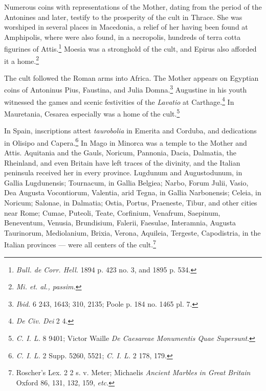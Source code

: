 \documentclass[a4paper, 11pt, oneside, polutonikogreek, french]{article}
\begin{document}
Numerous coins with representations of the Mother, dating from the period of the Antonines and later, testify to the prosperity of the cult in Thrace. She was worshiped in several places in Macedonia, a relief of her having been found at Amphipolis, where were also found, in a necropolis, hundreds of terra cotta figurines of Attis.\footnote{\emph{Bull. de Corr. Hell.} 1894 p. 423 no. 3, and 1895 p. 534.} Moesia was a stronghold of the cult, and Epirus also afforded it a home.\footnote{\emph{Mi. et. al., passim.}}

The cult followed the Roman arms into Africa. The Mother appears on Egyptian coins of Antoninus Pius, Faustina, and Julia Domna.\footnote{\emph{Ibid.} 6 243, 1643; 310, 2135; Poole p. 184 no. 1465 pl. 7.} Augustine in his youth witnessed the games and scenic festivities of the \emph{Lavatio} at Carthage.\footnote{\emph{De Civ. Dei} 2 4.} In Mauretania, Cesarea especially was a home of the cult.\footnote{\emph{C. I. L.} 8 9401; Victor Waille \emph{De Caesareae Monumentis Quae Supersunt}.}

In Spain, inscriptions attest \emph{taurobolia} in Emerita and Corduba, and dedications in Olisipo and Capera.\footnote{\emph{C. I. L.} 2 Supp. 5260, 5521; \emph{C. I. L.} 2 178, 179.} In Mago in Minorca was a temple to the Mother and Attis. Aquitania and the Gauls, Noricum, Pannonia, Dacia, Dalmatia, the Rheinland, and even Britain have left traces of the divinity, and the Italian peninsula received her in every province. Lugdunum and Augustodunum, in Gallia Lugdunensis; Tournacum, in Gallia Belgiea; Narbo, Forum Julii, Vasio, Dea Augusta Vocontiorum, Valentia, arid Tegna, in Gallia Narbonensis; Celeia, in Noricum; Salonae, in Dalmatia; Ostia, Portus, Praeneste, Tibur, and other cities near Rome; Cumae, Puteoli, Teate, Corfinium, Venafrum, Saepinum, Beneventum, Venusia, Brundisium, Falerii, Faesulae, Interamnia, Augusta Taurinorum, Mediolanium, Brixia, Verona, Aquileia, Tergeste, Capodistria, in the Italian provinces --- were all centers of the cult.\footnote{Roscher's Lex. 2 2 s. v. Meter; Michaelis \emph{Ancient Marbles in Great Britain} Oxford 86, 131, 132, 159, \emph{etc.}}
\end{document}
